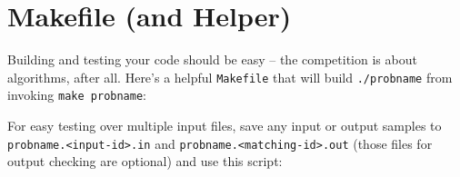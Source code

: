\section{Makefile (and Helper)}
Building and testing your code should be easy -- the competition is about algorithms, after all.
Here's a helpful \lstinline{Makefile} that will build \lstinline{./probname} from invoking \lstinline{make probname}:


For easy testing over multiple input files, save any input or output samples to \lstinline{probname.<input-id>.in} and \lstinline{probname.<matching-id>.out} (those files for output checking are optional) and use this script:

